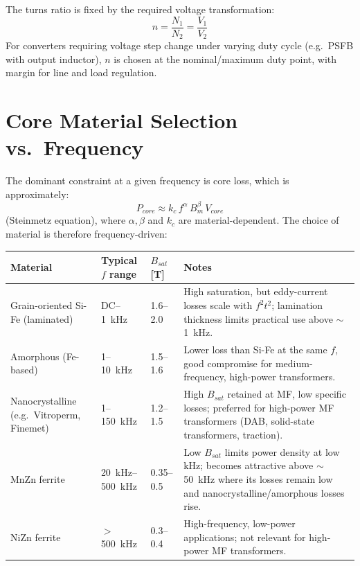 \documentclass[11pt,a4paper]{article}
\begin{document}
The turns ratio is fixed by the required voltage transformation:
\begin{equation}
    n = \frac{N_1}{N_2} = \frac{V_1}{V_2}
\end{equation}
For converters requiring voltage step change under varying duty cycle (e.g.\ PSFB with
output inductor), $n$ is chosen at the nominal/maximum duty point, with margin for
line and load regulation.

\section{Core Material Selection vs.\ Frequency}
The dominant constraint at a given frequency is core loss, which is approximately:
\begin{equation}
    P_{core} \approx k_c \, f^{\alpha} \, B_m^{\beta} \, V_{core}
\end{equation}
(Steinmetz equation), where $\alpha,\beta$ and $k_c$ are material-dependent. The choice
of material is therefore frequency-driven:

\begin{center}
\begin{tabular}{@{}lllp{5.5cm}@{}}
\toprule
Material & Typical $f$ range & $B_{sat}$ [T] & Notes \\
\midrule
Grain-oriented Si-Fe (laminated) & DC--\SI{1}{kHz} & 1.6--2.0 & High saturation, but eddy-current losses scale with $f^2 t^2$; lamination thickness limits practical use above $\sim$\SI{1}{kHz}. \\
Amorphous (Fe-based) & \SI{1}{}--\SI{10}{kHz} & 1.5--1.6 & Lower loss than Si-Fe at the same $f$, good compromise for medium-frequency, high-power transformers. \\
Nanocrystalline (e.g.\ Vitroperm, Finemet) & \SI{1}{}--\SI{150}{kHz} & 1.2--1.5 & High $B_{sat}$ retained at MF, low specific losses; preferred for high-power MF transformers (DAB, solid-state transformers, traction). \\
MnZn ferrite & \SI{20}{kHz}--\SI{500}{kHz} & 0.35--0.5 & Low $B_{sat}$ limits power density at low kHz; becomes attractive above $\sim$\SI{50}{kHz} where its losses remain low and nanocrystalline/amorphous losses rise. \\
NiZn ferrite & $>$\SI{500}{kHz} & 0.3--0.4 & High-frequency, low-power applications; not relevant for high-power MF transformers. \\
\bottomrule
\end{tabular}
\end{center}
\end{document}
